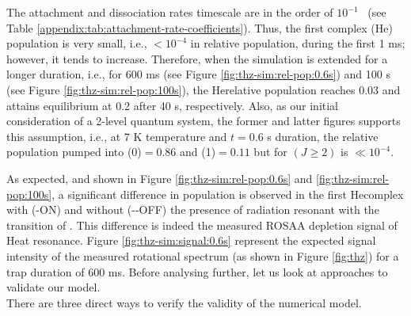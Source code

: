 % 


The attachment and dissociation rates timescale are in the order of $10^{-1}$
\pers\ (see Table \ref{appendix:tab:attachment-rate-coefficients}). Thus, the
first complex (He\CD) population is very small, i.e., $<10^{-4}$ in relative
population, during the first 1 ms; however, it tends to increase. Therefore,
when the simulation is extended for a longer duration, i.e., for 600 ms (see
Figure \ref{fig:thz-sim:rel-pop:0.6s}) and 100 s (see Figure
\ref{fig:thz-sim:rel-pop:100s}), the He\CD relative population reaches 0.03 and
attains equilibrium at 0.2 after 40 s, respectively. Also, as our initial
consideration of a 2-level quantum system, the former and latter figures
supports this assumption, i.e., at 7 K temperature and $t=0.6$ s duration, 
the relative population pumped into \CD(0)$=0.86$ and \CD(1)$=0.11$ 
but for \CD$(J\geq 2)$ is $\ll 10^{-4}$.

As expected, and shown in Figure \ref{fig:thz-sim:rel-pop:0.6s} and
\ref{fig:thz-sim:rel-pop:100s}, a significant difference in population is
observed in the first He\CD complex with (-ON) and without (-\--OFF) the
presence of radiation resonant with the \CDline transition of \CD. This
difference is indeed the measured ROSAA depletion signal of He\CD at resonance.
Figure \ref{fig:thz-sim:signal:0.6s} represent the expected signal intensity of
the measured rotational spectrum (as shown in Figure \ref{fig:thz}) for a trap
duration of 600 ms. Before analysing further, let us look at approaches to
validate our model.\\

% 


There are three direct ways to verify the validity of the numerical model.

